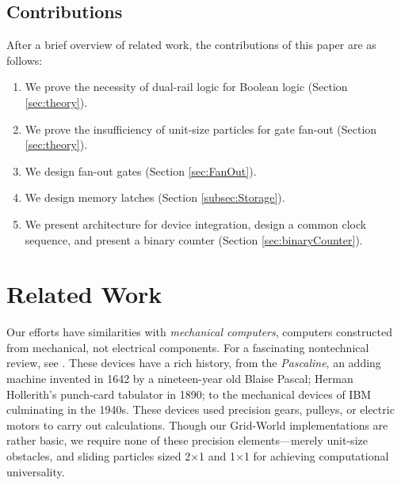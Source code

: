 \documentclass[letterpaper, 10 pt, conference]{ieeeconf}
\begin{document}
\subsection{Contributions}
  
 After a brief overview of related work,  the contributions of this paper are as follows:
  \begin{enumerate}
  \item We prove the necessity of dual-rail logic for Boolean logic (Section \ref{sec:theory}).
  \item We prove the insufficiency of unit-size particles for gate fan-out (Section \ref{sec:theory}).
  \item We design {\sc fan-out} gates (Section \ref{sec:FanOut}).
  \item We design memory latches (Section \ref{subsec:Storage}).
  \item We present architecture for device integration, design a common clock sequence, and present a binary counter (Section \ref{sec:binaryCounter}).
    \end{enumerate}

\section{Related Work}\label{sec:RelatedWork}
Our efforts have similarities with \emph{mechanical computers},  computers
constructed from mechanical, not electrical components. For a fascinating
nontechnical review, see \cite{McCourtney1999}.  These devices have a rich
history, from the \emph{Pascaline}, an adding machine invented in 1642 by a
nineteen-year old Blaise Pascal; Herman Hollerith's punch-card tabulator in
1890; to the mechanical devices of IBM culminating in the 1940s.  These devices
used precision gears, pulleys, or electric motors to carry out calculations.
Though our {\sc Grid-World} implementations are rather basic, 
we require none of these precision elements---merely unit-size obstacles,  and
sliding particles sized 2$\times$1 and 1$\times$1 for achieving computational universality.
\end{document}
